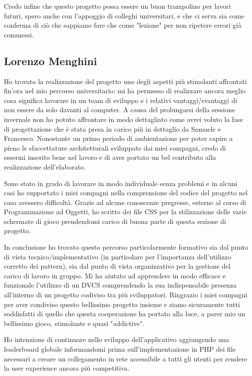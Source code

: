 \documentclass[a4paper,12pt]{report}
\begin{document}
Credo infine che questo progetto possa essere un buon trampolino per lavori futuri, spero anche con l'appoggio di colleghi universitari, e che ci serva sia come conferma di ciò che sappiamo fare che come "lezione" per non ripetere errori già commessi.

\subsection*{Lorenzo Menghini}
Ho trovato la realizzazione del progetto uno degli aspetti più stimolanti affrontati fin'ora nel mio percorso universitario: mi ha permesso di realizzare ancora meglio cosa significa lavorare in un team di sviluppo e i relativi vantaggi/svantaggi di non essere da solo davanti al computer.
A causa del prolungarsi della sessione invernale non ho potuto affrontare in modo dettagliato come avrei voluto la fase di progettazione che è stata presa in carico più in dettaglio da Samuele e Francesco. Nonostante un primo periodo di ambientazione per poter capire a pieno le sfaccettature architetturali sviluppate dai miei compagni, credo di essermi inserito bene nel lavoro e di aver portato un bel contributo alla realizzazione dell'elaborato.

Sono stato in grado di lavorare in modo individuale senza problemi e in alcuni casi ho supportato i miei compagni nella comprensione del codice del progetto nel caso avessero difficoltà.
Grazie ad alcune conoscenze pregresse, esterne al corso di Programmazione ad Oggetti, ho scritto dei file CSS per la stilizzazione delle varie schermate di gioco prendendomi carico di buona parte di questa sezione di progetto.

In conclusione ho trovato questo percorso particolarmente formativo sia dal punto di vista tecnico/implementativo (in particolare per l'importanza dell'utilizzo corretto dei pattern), sia dal punto di vista organizzativo per la gestione del carico di lavoro in gruppo.
Mi ha aiutato ad apprendere in modo efficace e funzionale l'utilizzo di un DVCS comprendendo la sua indispensabile presenza all'interno di un progetto codiviso tra più sviluppatori.
Ringrazio i miei compagni per aver condiviso questo bellissimo progetto insieme e siamo sicuramente tutti soddisfatti di quello che questa cooperazione ha portato alla luce, a parer mio un bellissimo gioco, stimolante e quasi "addictive". 

Ho intenzione di continuare nello sviluppo dell'applicativo aggiungendo una leaderboard globale informandomi prima sull'implementazione in PHP dei file necessari a creare un collegamento in rete accessibile a tutti gli utenti per rendere la user experience ancora più competitiva.
\end{document}
